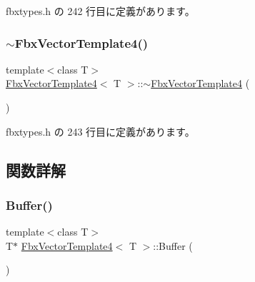  fbxtypes.\+h の 242 行目に定義があります。

\mbox{\label{class_fbx_vector_template4_a2e1c4bee469fa94cacaaa7754c520b36}} 
\subsubsection{\texorpdfstring{$\sim$\+Fbx\+Vector\+Template4()}{~FbxVectorTemplate4()}}
{\footnotesize\ttfamily template$<$class T$>$ \\
\hyperlink{class_fbx_vector_template4}{Fbx\+Vector\+Template4}$<$ T $>$\+::$\sim$\hyperlink{class_fbx_vector_template4}{Fbx\+Vector\+Template4} (\begin{DoxyParamCaption}{ }\end{DoxyParamCaption})\hspace{0.3cm}{\ttfamily [inline]}}



 fbxtypes.\+h の 243 行目に定義があります。



\subsection{関数詳解}
\mbox{\label{class_fbx_vector_template4_a1ed89bb0b8aa35be8852863ff8e45b12}} 
\subsubsection{\texorpdfstring{Buffer()}{Buffer()}\hspace{0.1cm}{\footnotesize\ttfamily [1/2]}}
{\footnotesize\ttfamily template$<$class T$>$ \\
T$\ast$ \hyperlink{class_fbx_vector_template4}{Fbx\+Vector\+Template4}$<$ T $>$\+::Buffer (\begin{DoxyParamCaption}{ }\end{DoxyParamCaption})\hspace{0.3cm}{\ttfamily [inline]}}



